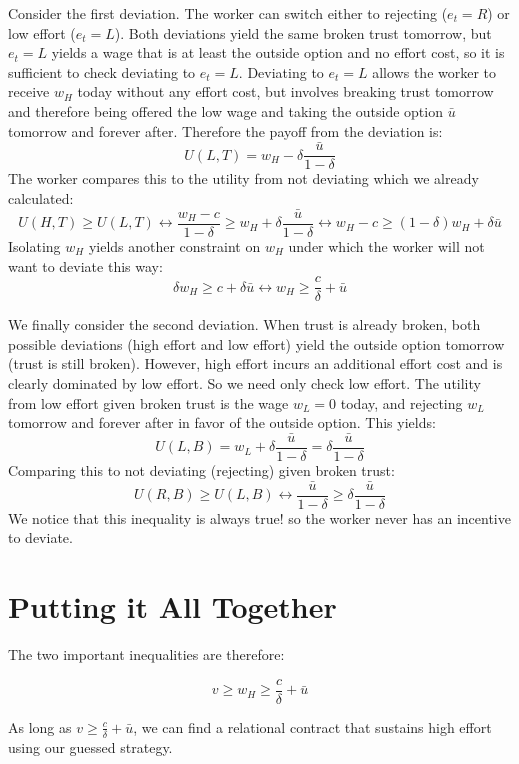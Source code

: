 \documentclass[14pt]{article}
\begin{document}
Consider the first deviation. The worker can switch either to rejecting ($e_t=R$) or low effort ($e_t=L$). Both deviations yield the same broken trust tomorrow, but $e_t=L$ yields a wage that is at least the outside option and no effort cost, so it is sufficient to check deviating to $e_t=L$. Deviating to $e_t=L$ allows the worker to receive $w_H$ today without any effort cost, but involves breaking trust tomorrow and therefore being offered the low wage and taking the outside option $\bar u$ tomorrow and forever after. Therefore the payoff from the deviation is:
\[U(L, T) = w_H - \delta \frac{\bar u}{1-\delta} \]
The worker compares this to the utility from not deviating which we already calculated:
\[  U(H, T) \geq U(L,T) \leftrightarrow  \frac{w_H-c}{1-\delta}  \geq w_H + \delta \frac{\bar u}{1-\delta} \leftrightarrow  w_H-c \geq (1-\delta)w_H +\delta \bar u \]
Isolating $w_H$ yields another constraint on $w_H$ under which the worker will not want to deviate this way:
\[\delta w_H \geq c+ \delta \bar u \leftrightarrow  w_H \geq \frac{c}{\delta}+  \bar u \]

We finally consider the second deviation. When trust is already broken, both possible deviations (high effort and low effort) yield the outside option tomorrow (trust is still broken). However, high effort incurs an additional effort cost and is clearly dominated by low effort. So we need only check low effort. The utility from low effort given broken trust is the wage $w_L=0$ today, and rejecting $w_L$ tomorrow and forever after in favor of the outside option. This yields:
\[U(L, B) = w_L+ \delta \frac{\bar u}{1-\delta}= \delta \frac{\bar u}{1-\delta}\]
Comparing this to not deviating (rejecting) given broken trust:
\[  U(R,B) \geq U(L,B) \leftrightarrow   \frac{\bar u}{1-\delta} \geq \delta \frac{\bar u}{1-\delta}\]
We notice that this inequality is always true! so the worker never has an incentive to deviate.

\section{Putting it All Together}

The two important inequalities are therefore:

\[  v \geq w_H \geq \frac{c}{\delta}+  \bar u\]

As long as $v\geq  \frac{c}{\delta}+  \bar u$, we can find a relational contract that sustains high effort using our guessed strategy.
\end{document}

